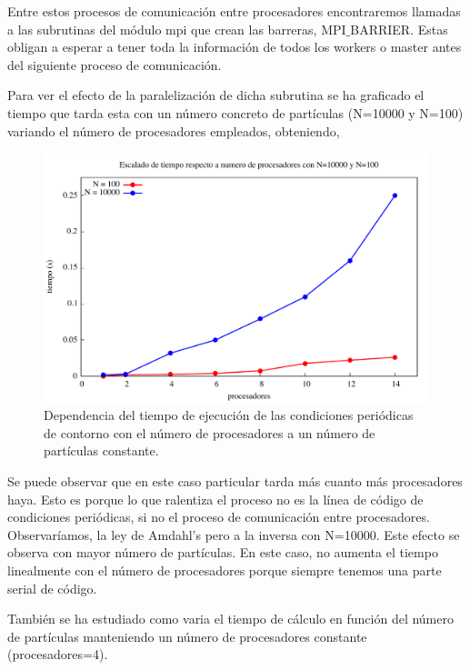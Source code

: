 \documentclass[onecolumn]{article}
\begin{document}
Entre estos procesos de comunicación entre procesadores encontraremos llamadas a las subrutinas del módulo mpi que crean las barreras, MPI$\_$BARRIER. Estas obligan a esperar a tener toda la información de todos los workers o master antes del siguiente proceso de comunicación. 

Para ver el efecto de la paralelización de dicha subrutina se ha graficado el tiempo que tarda esta con un número concreto de partículas (N=10000 y N=100) variando el número de procesadores empleados, obteniendo,


 \begin{figure}[h!]
	\includegraphics[scale=0.4]{lorena_proc.pdf}
	\caption{Dependencia del tiempo de ejecución de las condiciones periódicas de contorno con el número de procesadores a un número de partículas constante.}
\end{figure}


Se puede observar que en este caso particular tarda más cuanto más procesadores haya. Esto es porque lo que ralentiza el proceso no es la línea de código de condiciones periódicas, si no el proceso de comunicación entre procesadores. Observaríamos, la ley de Amdahl’s pero a la inversa con N=10000. Este efecto se observa con mayor número de partículas. En este caso, no aumenta el tiempo linealmente con el número de procesadores porque siempre tenemos una parte serial de código. 

También se ha estudiado como varia el tiempo de cálculo en función del número de partículas manteniendo un número de procesadores constante (procesadores=4). 
\end{document}
